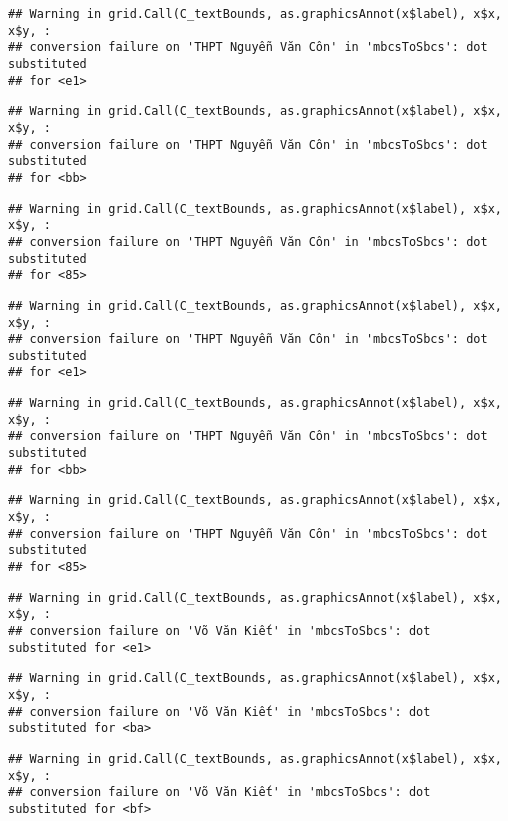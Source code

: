 \documentclass[
]{article}
\begin{document}
\begin{verbatim}
## Warning in grid.Call(C_textBounds, as.graphicsAnnot(x$label), x$x, x$y, :
## conversion failure on 'THPT Nguyễn Văn Côn' in 'mbcsToSbcs': dot substituted
## for <e1>
\end{verbatim}

\begin{verbatim}
## Warning in grid.Call(C_textBounds, as.graphicsAnnot(x$label), x$x, x$y, :
## conversion failure on 'THPT Nguyễn Văn Côn' in 'mbcsToSbcs': dot substituted
## for <bb>
\end{verbatim}

\begin{verbatim}
## Warning in grid.Call(C_textBounds, as.graphicsAnnot(x$label), x$x, x$y, :
## conversion failure on 'THPT Nguyễn Văn Côn' in 'mbcsToSbcs': dot substituted
## for <85>
\end{verbatim}

\begin{verbatim}
## Warning in grid.Call(C_textBounds, as.graphicsAnnot(x$label), x$x, x$y, :
## conversion failure on 'THPT Nguyễn Văn Côn' in 'mbcsToSbcs': dot substituted
## for <e1>
\end{verbatim}

\begin{verbatim}
## Warning in grid.Call(C_textBounds, as.graphicsAnnot(x$label), x$x, x$y, :
## conversion failure on 'THPT Nguyễn Văn Côn' in 'mbcsToSbcs': dot substituted
## for <bb>
\end{verbatim}

\begin{verbatim}
## Warning in grid.Call(C_textBounds, as.graphicsAnnot(x$label), x$x, x$y, :
## conversion failure on 'THPT Nguyễn Văn Côn' in 'mbcsToSbcs': dot substituted
## for <85>
\end{verbatim}

\begin{verbatim}
## Warning in grid.Call(C_textBounds, as.graphicsAnnot(x$label), x$x, x$y, :
## conversion failure on 'Võ Văn Kiết' in 'mbcsToSbcs': dot substituted for <e1>
\end{verbatim}

\begin{verbatim}
## Warning in grid.Call(C_textBounds, as.graphicsAnnot(x$label), x$x, x$y, :
## conversion failure on 'Võ Văn Kiết' in 'mbcsToSbcs': dot substituted for <ba>
\end{verbatim}

\begin{verbatim}
## Warning in grid.Call(C_textBounds, as.graphicsAnnot(x$label), x$x, x$y, :
## conversion failure on 'Võ Văn Kiết' in 'mbcsToSbcs': dot substituted for <bf>
\end{verbatim}
\end{document}
